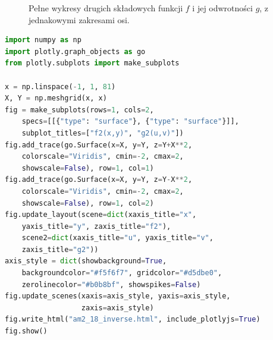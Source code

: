 \begin{figure}[htbp]
\centering
{}
\caption{Pełne wykresy drugich składowych funkcji $f$ i jej odwrotności $g$, z jednakowymi zakresami osi.}
\label{ma2:fig:inverse-components-3d}
\end{figure}

\begin{lstlisting}[language=Python]
import numpy as np
import plotly.graph_objects as go
from plotly.subplots import make_subplots

x = np.linspace(-1, 1, 81)
X, Y = np.meshgrid(x, x)
fig = make_subplots(rows=1, cols=2,
    specs=[[{"type": "surface"}, {"type": "surface"}]],
    subplot_titles=["f2(x,y)", "g2(u,v)"])
fig.add_trace(go.Surface(x=X, y=Y, z=Y+X**2,
    colorscale="Viridis", cmin=-2, cmax=2,
    showscale=False), row=1, col=1)
fig.add_trace(go.Surface(x=X, y=Y, z=Y-X**2,
    colorscale="Viridis", cmin=-2, cmax=2,
    showscale=False), row=1, col=2)
fig.update_layout(scene=dict(xaxis_title="x",
    yaxis_title="y", zaxis_title="f2"),
    scene2=dict(xaxis_title="u", yaxis_title="v",
    zaxis_title="g2"))
axis_style = dict(showbackground=True,
    backgroundcolor="#f5f6f7", gridcolor="#d5dbe0",
    zerolinecolor="#b0b8bf", showspikes=False)
fig.update_scenes(xaxis=axis_style, yaxis=axis_style,
                  zaxis=axis_style)
fig.write_html("am2_18_inverse.html", include_plotlyjs=True)
fig.show()
\end{lstlisting}


